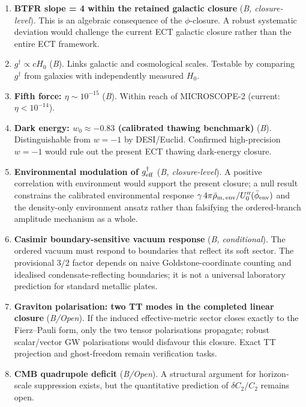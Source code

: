 \documentclass[11pt,a4paper]{article}
\begin{document}
\begin{enumerate}
\item \textbf{BTFR slope = 4 within the retained galactic closure} (\emph{B, closure-level}). This is an algebraic consequence of the $\phi$-closure. A robust systematic deviation would challenge the current ECT galactic closure rather than the entire ECT framework.

\item \textbf{$g^\dagger \propto cH_0$} (\emph{B}). Links galactic and cosmological scales. Testable by comparing $g^\dagger$ from galaxies with independently measured $H_0$.

\item \textbf{Fifth force: $\eta \sim 10^{-15}$} (\emph{B}). Within reach of MICROSCOPE-2 (current: $\eta < 10^{-14}$).

\item \textbf{Dark energy: $w_0 \approx -0.83$ (calibrated thawing benchmark)} (\emph{B}). Distinguishable from $w=-1$ by DESI/Euclid. Confirmed high-precision $w=-1$ would rule out the present ECT thawing dark-energy closure.

\item \textbf{Environmental modulation of $g^\dagger_{\rm eff}$} (\emph{B, closure-level}). A positive correlation with environment would support the present closure; a null result constrains the calibrated environmental response $\gamma\,4\pi\bar\rho_{{\rm m},\,{\rm env}}/U_0''(\bar\phi_{\rm env})$ and the density-only environment ansatz rather than falsifying the ordered-branch amplitude mechanism as a whole.

\item \textbf{Casimir boundary-sensitive vacuum response} (\emph{B, conditional}). The ordered vacuum must respond to boundaries that reflect its soft sector. The provisional $3/2$ factor depends on naive Goldstone-coordinate counting and idealised condensate-reflecting boundaries; it is not a universal laboratory prediction for standard metallic plates.

\item \textbf{Graviton polarisation: two TT modes in the completed linear closure} (\emph{B/Open}). If the induced effective-metric sector closes exactly to the Fierz--Pauli form, only the two tensor polarisations propagate; robust scalar/vector GW polarisations would disfavour this closure. Exact TT projection and ghost-freedom remain verification tasks.

\item \textbf{CMB quadrupole deficit} (\emph{B/Open}). A structural argument for horizon-scale suppression exists, but the quantitative prediction of $\delta C_2/C_2$ remains open.


\end{enumerate}
\end{document}
